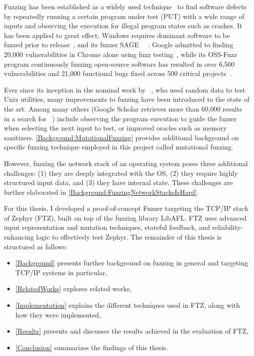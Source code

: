 \documentclass[twocolumn]{article}
\newcommand{\proj}{FTZ\xspace}
\let\savedCite=\cite
\renewcommand{\cite}{\unskip~\savedCite}
\begin{document}
Fuzzing has been established as a widely used technique\cite{Demystifying} to find software defects by repeatedly running a certain program under test (PUT) with a wide range of inputs and observing the execution for illegal program states such as crashes. It has been applied to great effect: Windows requires dominant software to be fuzzed prior to release\cite{Demystifying}, and its fuzzer SAGE\cite{SAGE} \cite{FuzzingTheStateOfTheArt}. Google admitted to finding 20,000 vulnerabilities in Chrome alone using fuzz testing\cite{Demystifying}, while its OSS-Fuzz program continuously fuzzing open-source software has resulted in over 6,500 vulnerabilities and 21,000 functional bugs fixed across 500 critical projects\cite{ClusterFuzzLite}.

Ever since its inception in the nominal work by \citeauthor{UNIX}\cite{UNIX}, who used random data to test Unix utilities, many improvements to fuzzing have been introduced to the state of the art. Among many others (Google Scholar retrieves more than 60,000 results in a search for \cite{GoogleScholarFuzzing}) include observing the program execution to guide the fuzzer when selecting the next input to test, or improved oracles such as memory sanitizers. \cref{Background:MutationalFuzzing} provides additional background on specific fuzzing technique employed in this project called mutational fuzzing.

However, fuzzing the network stack of an operating system poses three additional challenges: (1) they are deeply integrated with the OS, (2) they require highly structured input data, and (3) they have internal state. These challenges are further elaborated in \cref{Background:FuzzingNetworkStacksIsHard}.

For this thesis, I developed a proof-of-concept Fuzzer targeting the TCP/IP stack of Zephyr (\proj), built on top of the fuzzing library LibAFL. \proj uses advanced input representation and mutation techniques, stateful feedback, and reliability-enhancing logic to effectively test Zephyr. The remainder of this thesis is structured as follows:

\begin{itemize}
  \item \cref{Background} presents further background on fuzzing in general and targeting TCP/IP systems in particular,
  \item \cref{RelatedWorks} explores related works,
  \item \cref{Implementation} explains the different techniques used in \proj, along with how they were implemented,
  \item \cref{Results} presents and discusses the results achieved in the evaluation of \proj,
  \item \cref{Conclusion} summarizes the findings of this thesis.
\end{itemize}
\end{document}
